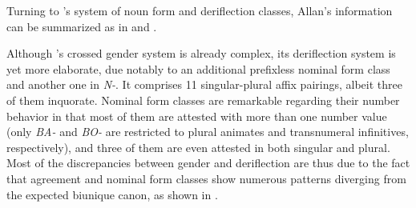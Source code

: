 \documentclass[output=collectionpaper]{langsci/langscibook}
\begin{document}
Turning to 's system of noun form and deriflection classes, Allan's information can be summarized as in  and .

Although 's crossed gender system is already complex, its deriflection system is yet more elaborate, due notably to an additional prefixless nominal form class and another one in \textit{N-}. It comprises 11 singular-plural affix pairings, albeit three of them inquorate. Nominal form classes are remarkable regarding their number behavior in that most of them are attested with more than one number value (only \textit{BA-} and \textit{BO-} are restricted to plural animates and transnumeral infinitives, respectively), and three of them are even attested in both singular and plural. Most of the discrepancies between gender and deriflection are thus due to the fact that agreement and nominal form classes show numerous patterns diverging from the expected biunique  canon, as shown in .
\end{document}
